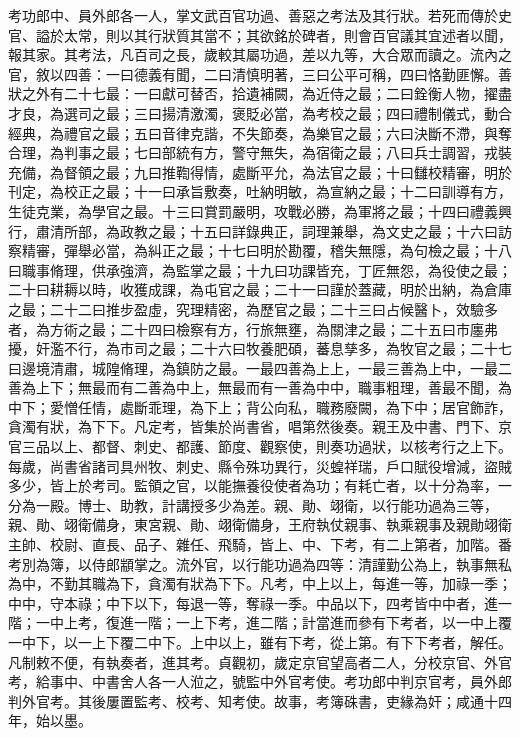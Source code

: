 \begin{pinyinscope}
 考功郎中、員外郎各一人，掌文武百官功過、善惡之考法及其行狀。若死而傳於史官、謚於太常，則以其行狀質其當不；其欲銘於碑者，則會百官議其宜述者以聞，報其家。其考法，凡百司之長，歲較其屬功過，差以九等，大合眾而讀之。流內之官，敘以四善：一曰德義有聞，二曰清慎明著，三曰公平可稱，四曰恪勤匪懈。善狀之外有二十七最：一曰獻可替否，拾遺補闕，為近侍之最；二曰銓衡人物，擢盡才良，為選司之最；三曰揚清激濁，褒貶必當，為考校之最；四曰禮制儀式，動合經典，為禮官之最；五曰音律克諧，不失節奏，為樂官之最；六曰決斷不滯，與奪合理，為判事之最；七曰部統有方，警守無失，為宿衛之最；八曰兵士調習，戎裝充備，為督領之最；九曰推鞫得情，處斷平允，為法官之最；十曰讎校精審，明於刊定，為校正之最；十一曰承旨敷奏，吐納明敏，為宣納之最；十二曰訓導有方，生徒克業，為學官之最。十三曰賞罰嚴明，攻戰必勝，為軍將之最；十四曰禮義興行，肅清所部，為政教之最；十五曰詳錄典正，詞理兼舉，為文史之最；十六曰訪察精審，彈舉必當，為糾正之最；十七曰明於勘覆，稽失無隱，為句檢之最；十八曰職事脩理，供承強濟，為監掌之最；十九曰功課皆充，丁匠無怨，為役使之最；二十曰耕耨以時，收獲成課，為屯官之最；二十一曰謹於蓋藏，明於出納，為倉庫之最；二十二曰推步盈虛，究理精密，為歷官之最；二十三曰占候醫卜，效驗多者，為方術之最；二十四曰檢察有方，行旅無壅，為關津之最；二十五曰市廛弗擾，奸濫不行，為市司之最；二十六曰牧養肥碩，蕃息孳多，為牧官之最；二十七曰邊境清肅，城隍脩理，為鎮防之最。一最四善為上上，一最三善為上中，一最二善為上下；無最而有二善為中上，無最而有一善為中中，職事粗理，善最不聞，為中下；愛憎任情，處斷乖理，為下上；背公向私，職務廢闕，為下中；居官飾詐，貪濁有狀，為下下。凡定考，皆集於尚書省，唱第然後奏。親王及中書、門下、京官三品以上、都督、刺史、都護、節度、觀察使，則奏功過狀，以核考行之上下。每歲，尚書省諸司具州牧、刺史、縣令殊功異行，災蝗祥瑞，戶口賦役增減，盜賊多少，皆上於考司。監領之官，以能撫養役使者為功；有耗亡者，以十分為率，一分為一殿。博士、助教，計講授多少為差。親、勛、翊衛，以行能功過為三等，親、勛、翊衛備身，東宮親、勛、翊衛備身，王府執仗親事、執乘親事及親勛翊衛主帥、校尉、直長、品子、雜任、飛騎，皆上、中、下考，有二上第者，加階。番考別為簿，以侍郎顓掌之。流外官，以行能功過為四等：清謹勤公為上，執事無私為中，不勤其職為下，貪濁有狀為下下。凡考，中上以上，每進一等，加祿一季；中中，守本祿；中下以下，每退一等，奪祿一季。中品以下，四考皆中中者，進一階；一中上考，復進一階；一上下考，進二階；計當進而參有下考者，以一中上覆一中下，以一上下覆二中下。上中以上，雖有下考，從上第。有下下考者，解任。凡制敕不便，有執奏者，進其考。貞觀初，歲定京官望高者二人，分校京官、外官考，給事中、中書舍人各一人涖之，號監中外官考使。考功郎中判京官考，員外郎判外官考。其後屢置監考、校考、知考使。故事，考簿硃書，吏緣為奸；咸通十四年，始以墨。




\end{pinyinscope}
